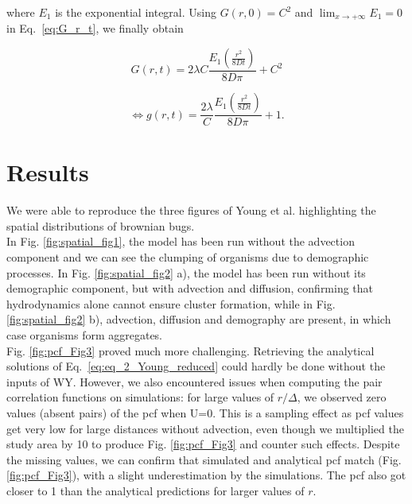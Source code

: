 where $E_1$ is the exponential integral. Using $G(r,0)=C^{2}$ and
$\lim_{x\rightarrow+\infty}E_1=0$ in Eq.~\ref{eq:G_r_t}, we finally obtain

\begin{equation}
G(r,t)=2\lambda C\frac{E_1\left(\frac{r^{2}}{8Dt}\right)}{8D\pi}+C^{2}
\end{equation}

\begin{equation}
\Leftrightarrow g(r,t)=\frac{2\lambda}{C}\frac{E_1\left(\frac{r^{2}}{8Dt}\right)}{8D\pi}+1.
\end{equation}

\section*{Results}

We were able to reproduce the three figures of Young et al. \cite{young_reproductive_2001} highlighting the spatial distributions of brownian bugs.\\

In Fig. \ref{fig:spatial_fig1}, the model has been run without the advection component and we can see the clumping of organisms due to demographic processes. In Fig. \ref{fig:spatial_fig2} a), the model has been run without its demographic component, but with advection and diffusion, confirming that hydrodynamics alone cannot ensure cluster formation, while in Fig.  \ref{fig:spatial_fig2} b), advection, diffusion and demography are present, in which case organisms form aggregates.\\
  
Fig. \ref{fig:pcf_Fig3} proved much more challenging. Retrieving the analytical solutions of Eq.~\ref{eq:eq_2_Young_reduced} could hardly be done without the inputs of WY. However, we also encountered issues when computing the pair correlation functions on simulations: for large values of $r/\Delta$, we observed zero values (absent pairs) of the pcf when U=0. This is a sampling effect as pcf values get very low for large distances without advection, even though we multiplied the study area by 10 to produce Fig.  \ref{fig:pcf_Fig3} and counter such effects. Despite the missing values, we can confirm that simulated and analytical pcf match (Fig. \ref{fig:pcf_Fig3}), with a slight underestimation by the simulations. The pcf also got closer to 1 than the analytical predictions for larger values of $r$. %

